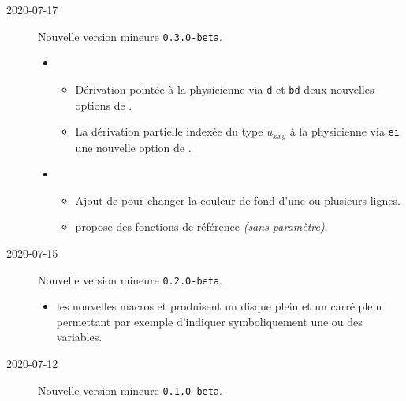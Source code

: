 \documentclass[12pt,a4paper]{article}
\begin{document}
\begin{description}
    \separation


    \medskip
    \item[2020-07-17] Nouvelle version mineure \verb+0.3.0-beta+.
    
    \begin{itemize}[itemsep=.5em]
        \item {}
        \begin{itemize}[itemsep=.5em]
            \item Dérivation pointée à la physicienne via \verb+d+ et \verb+bd+ deux nouvelles options de .
    
            \item La dérivation partielle indexée du type $u_{xxy}$ à la physicienne via \verb+ei+ une nouvelle option de .
        \end{itemize}
    
    
        \item {}
        \begin{itemize}[itemsep=.5em]
            \item Ajout de  pour changer la couleur de fond d'une ou plusieurs lignes.
    
    
            \item {} propose des fonctions de référence \emph{(sans paramètre)}.
        \end{itemize}
    \end{itemize}
    
    \separation


    \medskip
    \item[2020-07-15] Nouvelle version mineure \verb+0.2.0-beta+.
    
    \begin{itemize}[itemsep=.5em]
        \item {} les nouvelles macros  et  produisent un disque plein et un carré plein permettant par exemple d'indiquer symboliquement une ou des variables.
    \end{itemize}
    
    \separation

    \medskip
    \item[2020-07-12] Nouvelle version mineure \verb+0.1.0-beta+. 
        

\end{description}
\end{document}
